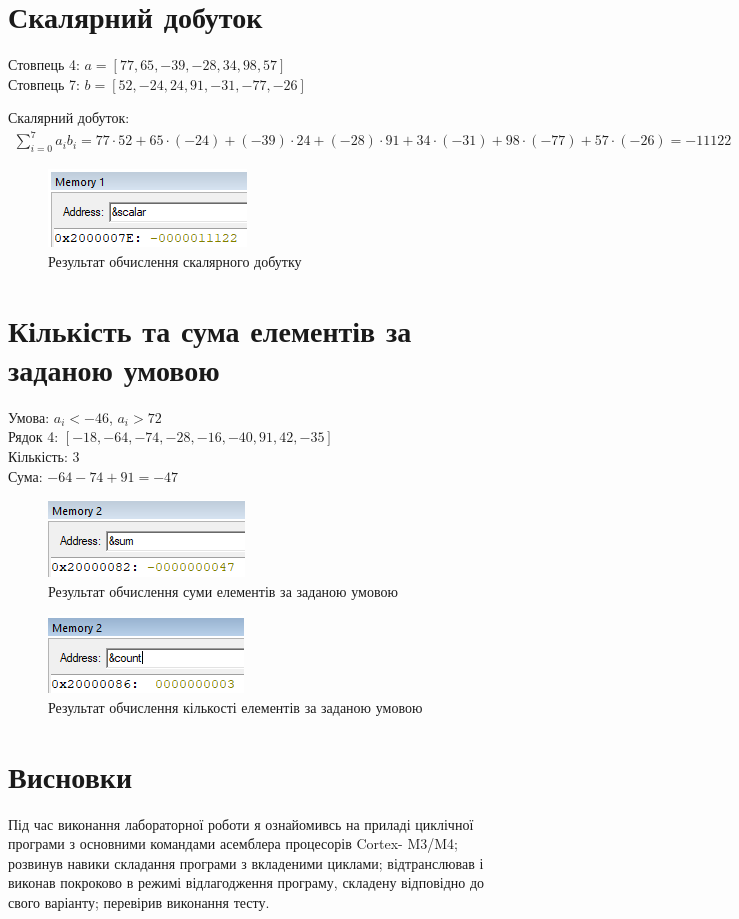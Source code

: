 \documentclass{article}
\begin{document}
\begin{normalsize}
\section*{Скалярний добуток}
Стовпець 4: $a=[77, 65, -39, -28, 34, 98, 57]$\\
Стовпець 7: $b=[52, -24,24,91,-31,-77,-26]$

\noindent Скалярний добуток: 
\begin{gather}
	\sum_{i=0}^{7}a_ib_i=77\cdot52+65\cdot(-24)+(-39)\cdot24+(-28)\cdot91+34\cdot(-31)+98\cdot(-77)+57\cdot(-26)=-11122\nonumber
\end{gather}

\begin{figure}[H]
	\centering
	\includegraphics[scale=0.7]{3}
	\caption{Результат обчислення скалярного добутку}
\end{figure}

\section*{Кількість та сума елементів за заданою умовою}
Умова: $a_i<-46$, $a_i>72$\\
Рядок 4: $[-18, -64, -74, -28, -16, -40, 91, 42, -35]$\\
Кількість: 3\\
Сума: $-64-74+91=-47$
\begin{figure}[H]
	\centering
	\includegraphics[scale=0.7]{4}
	\caption{Результат обчислення суми елементів за заданою умовою}
\end{figure}

\begin{figure}[H]
	\centering
	\includegraphics[scale=0.7]{5}
	\caption{Результат обчислення кількості елементів за заданою умовою}
\end{figure}
			
		\section*{Висновки}
		Під час виконання лабораторної роботи я ознайомивсь на приладі циклічної програми з основними командами асемблера процесорів Cortex- M3/M4; розвинув навики складання програми з вкладеними циклами; відтранслював і виконав покроково в режимі відлагодження програму, складену відповідно до свого варіанту; перевірив виконання тесту.
		
	\end{normalsize}
\end{document}
